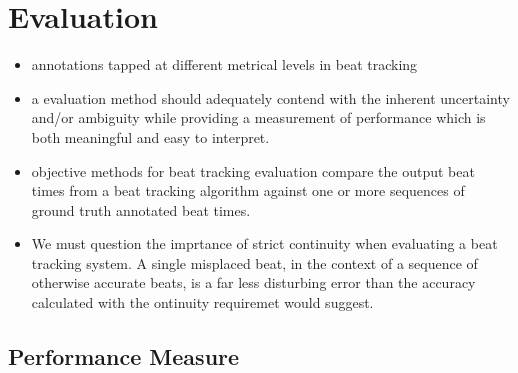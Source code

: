 \documentclass{scrartcl}
\begin{document}












\newpage
\section{Evaluation}


\begin{itemize}
\item annotations tapped at different metrical levels in beat tracking
\item a evaluation method should adequately contend with the inherent uncertainty and/or ambiguity while providing a measurement of performance which is both meaningful and easy to interpret. \cite{Davies2009b}
\item objective methods for beat tracking evaluation compare the output beat times from a beat tracking algorithm against one or more sequences of ground truth annotated beat times. \cite{Davies2009b}
\item We must question the imprtance of strict continuity when evaluating a beat tracking system. A single misplaced beat, in the context of a sequence of otherwise accurate beats, is a far less disturbing error than the accuracy calculated with the ontinuity requiremet would suggest. 
\end{itemize}


\subsection{Performance Measure}
\end{document}
